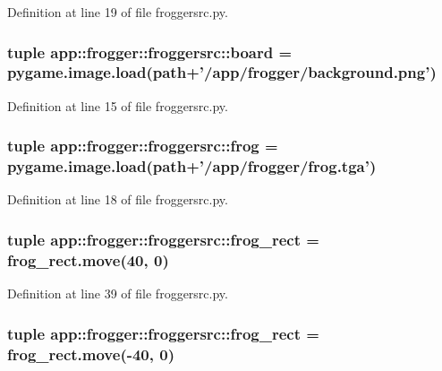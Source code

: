 Definition at line 19 of file froggersrc.py.
\subsubsection{\setlength{\rightskip}{0pt plus 5cm}tuple {\bf app::frogger::froggersrc::board} = pygame.image.load({\bf path}+'/app/frogger/background.png')\hspace{0.3cm}{\tt  [static]}}\label{namespaceapp_1_1frogger_1_1froggersrc_19d53b1ee8d86369c17113e009c6e061}




Definition at line 15 of file froggersrc.py.
\subsubsection{\setlength{\rightskip}{0pt plus 5cm}tuple {\bf app::frogger::froggersrc::frog} = pygame.image.load({\bf path}+'/app/frogger/frog.tga')\hspace{0.3cm}{\tt  [static]}}\label{namespaceapp_1_1frogger_1_1froggersrc_114e1d4c8153811820811dab40c9e6ee}




Definition at line 18 of file froggersrc.py.
\subsubsection{\setlength{\rightskip}{0pt plus 5cm}tuple {\bf app::frogger::froggersrc::frog\_\-rect} = frog\_\-rect.move(40, 0)\hspace{0.3cm}{\tt  [static]}}\label{namespaceapp_1_1frogger_1_1froggersrc_23072300a3dbff400d01dfdcaaed3401}




Definition at line 39 of file froggersrc.py.
\subsubsection{\setlength{\rightskip}{0pt plus 5cm}tuple {\bf app::frogger::froggersrc::frog\_\-rect} = frog\_\-rect.move(-40, 0)\hspace{0.3cm}{\tt  [static]}}\label{namespaceapp_1_1frogger_1_1froggersrc_23072300a3dbff400d01dfdcaaed3401}




